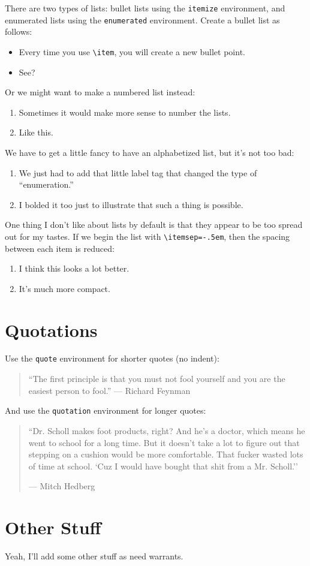 \documentclass[12pt]{article}
\begin{document}
There are two types of lists: bullet lists using the \verb|itemize| environment, and 
enumerated lists using the \verb|enumerated| environment. Create a bullet list as 
follows:
\begin{itemize}	
	\item Every time you use \verb|\item|, you will create a new bullet point.
	
	\item See?
\end{itemize}
Or we might want to make a numbered list instead:
\begin{enumerate}
	\item Sometimes it would make more sense to number the lists.
	
	\item Like this. 
\end{enumerate}
We have to get a little fancy to have an alphabetized list, but it's not too bad:
\begin{enumerate}[label=\textbf{(\alph*)}]
	\item We just had to add that little label tag that changed the type of ``enumeration.''
	
	\item I bolded it too just to illustrate that such a thing is possible.
\end{enumerate}
One thing I don't like about lists by default is that they appear to be too spread out for 
my tastes. If we begin the list with \verb|\itemsep=-.5em|, then the spacing between each
item is reduced:
\begin{enumerate}[label=\textbf{(\Alph*)}]
	\itemsep-.5em
	\item I think this looks a lot better.	
	\item It's much more compact. 
\end{enumerate}
	
	
	
\section{Quotations}

Use the \verb|quote| environment for shorter quotes (no indent):
\begin{quote}
	``The first principle is that you must not fool yourself and you are the easiest person to fool.'' --- Richard Feynman
\end{quote}
And use the \verb|quotation| environment for longer quotes:
\begin{quotation}
	``Dr. Scholl makes foot products, right? And he's a doctor, which means he went to school for a long time. But it doesn't take a lot to figure out that stepping on a cushion would be more comfortable. That fucker wasted lots of time at school. `Cuz I would have bought that shit from a Mr. Scholl.''
	
	\hfill --- Mitch Hedberg
\end{quotation}

	
	
\section{Other Stuff}
	
Yeah, I'll add some other stuff as need warrants. 
 
	
\end{document}

